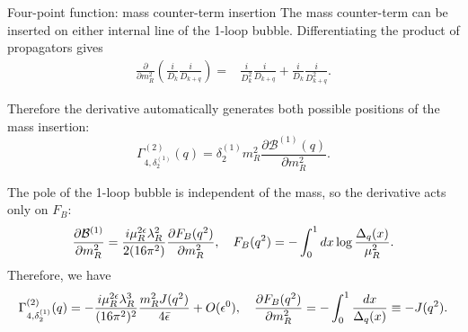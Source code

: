 \documentclass[aspectratio=169,10pt]{beamer}
\begin{document}
\begin{frame}{Four-point function: mass counter-term insertion}
\small
The mass counter-term can be inserted on either internal line
of the 1-loop bubble. Differentiating the product of propagators gives
\begin{align*}
\frac{\partial}{\partial m_R^2}
\left(
\frac{i}{D_k}
\frac{i}{D_{k+q}}
\right)
=&
\frac{i}{D_k^2}
\frac{i}{D_{k+q}} +
\frac{i}{D_k}
\frac{i}{D_{k+q}^2}.
\end{align*}

Therefore the derivative automatically generates both possible
positions of the mass insertion:
\begin{equation}
\Gamma_{4,\delta_2^{(1)}}^{(2)}(q)
=
\delta_2^{(1)}m_R^2
\frac{\partial\mathcal B^{(1)}(q)}
{\partial m_R^2}.
\end{equation}

The pole of the 1-loop bubble is independent of the mass, so
the derivative acts only on $F_B$:
\begin{equation}
\frac{\partial\mathcal B^{(1)}}{\partial m_R^2}
=
\frac{i\mu_R^{2\epsilon}\lambda_R^2}
{2(16\pi^2)}
\frac{\partial F_B(q^2)}
{\partial m_R^2}, \quad
F_B(q^2)
=
-\int_0^1dx
\log\frac{\Delta_q(x)}{\mu_R^2}.
\end{equation}
Therefore, we have
\begin{equation}
\Gamma_{4,\delta_2^{(1)}}^{(2)}(q)
=
-\frac{i\mu_R^{2\epsilon}\lambda_R^3} {(16\pi^2)^2}
\frac{m_R^2J(q^2)}
{4\bar\epsilon}
+
O(\epsilon^0),\quad \frac{\partial F_B(q^2)}
{\partial m_R^2}
=
-\int_0^1
\frac{dx}{\Delta_q(x)}
\equiv
-J(q^2).
\end{equation}


\end{frame}



    

    
\end{document}
